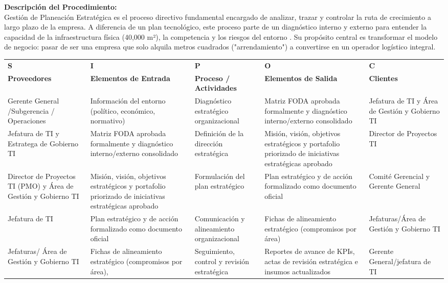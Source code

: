 \documentclass[11pt,letterpaper]{report}
\begin{document}
\textbf{Descripción del Procedimiento:} \\
Gestión de Planeación Estratégica es el proceso directivo fundamental encargado de analizar, trazar y controlar la ruta de crecimiento a largo plazo de la empresa. A diferencia de un plan tecnológico, este proceso parte de un diagnóstico interno y externo para entender la capacidad de la infraestructura física (40,000 m²), la competencia y los riesgos del entorno
. Su propósito central es transformar el modelo de negocio: pasar de ser una empresa que solo alquila metros cuadrados ("arrendamiento") a convertirse en un operador logístico integral.



\begin{center}
  \small
  \begin{tabularx}{\textwidth}{>{\raggedright\arraybackslash}p{} >{\raggedright\arraybackslash}p{} >{\raggedright\arraybackslash}X >{\raggedright\arraybackslash}p{} >{\raggedright\arraybackslash}p{}}
  \toprule
  \textbf{S} & \textbf{I} & \textbf{P} & \textbf{O} & \textbf{C} \\
  \textbf{Proveedores} & \textbf{Elementos de Entrada} & \textbf{Proceso / Actividades} & \textbf{Elementos de Salida} & \textbf{Clientes} \\
  \midrule
  Gerente General /Subgerencia / Operaciones & Información del entorno (político, económico, normativo) & Diagnóstico estratégico organizacional & Matriz FODA aprobada formalmente y diagnóstico interno/externo consolidado & Jefatura de TI y Área de Gestión y Gobierno TI \\
  \midrule
  Jefatura de TI y Estratega de Gobierno TI & Matriz FODA aprobada formalmente y diagnóstico interno/externo consolidado & Definición de la dirección estratégica & Misión, visión, objetivos estratégicos y portafolio priorizado de iniciativas estratégicas aprobado & Director de Proyectos TI \\
  \midrule
  Director de Proyectos TI (PMO) y Área de Gestión y Gobierno TI & Misión, visión, objetivos estratégicos y portafolio priorizado de iniciativas estratégicas aprobado & Formulación del plan estratégico & Plan estratégico y de acción formalizado como documento oficial & Comité Gerencial y Gerente General \\
  \midrule
  Jefatura de TI & Plan estratégico y de acción formalizado como documento oficial & Comunicación y alineamiento organizacional & Fichas de alineamiento estratégico (compromisos por área) & Jefaturas/Área de Gestión y Gobierno TI \\
  \midrule
  Jefaturas/ Área de Gestión y Gobierno TI & Fichas de alineamiento estratégico (compromisos por área), & Seguimiento, control y revisión estratégica & Reportes de avance de KPIs, actas de revisión estratégica e insumos actualizados & Gerente General/jefatura de TI \\
  \bottomrule
  \end{tabularx}
\end{center}
\end{document}
